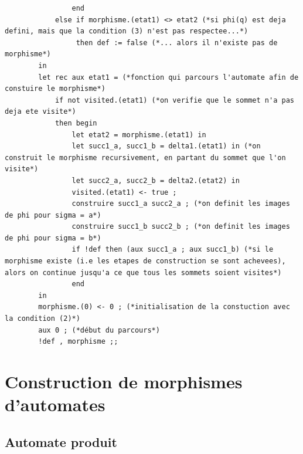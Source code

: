 \documentclass{article}
\begin{document}
\begin{enumerate}
\begin{verbatim}
                end
            else if morphisme.(etat1) <> etat2 (*si phi(q) est deja defini, mais que la condition (3) n'est pas respectee...*)
                 then def := false (*... alors il n'existe pas de morphisme*)
        in
        let rec aux etat1 = (*fonction qui parcours l'automate afin de constuire le morphisme*)
            if not visited.(etat1) (*on verifie que le sommet n'a pas deja ete visite*)
            then begin
                let etat2 = morphisme.(etat1) in
                let succ1_a, succ1_b = delta1.(etat1) in (*on construit le morphisme recursivement, en partant du sommet que l'on visite*)
                let succ2_a, succ2_b = delta2.(etat2) in
                visited.(etat1) <- true ;
                construire succ1_a succ2_a ; (*on definit les images de phi pour sigma = a*)
                construire succ1_b succ2_b ; (*on definit les images de phi pour sigma = b*)
                if !def then (aux succ1_a ; aux succ1_b) (*si le morphisme existe (i.e les etapes de construction se sont achevees), alors on continue jusqu'a ce que tous les sommets soient visites*)
                end 
        in
        morphisme.(0) <- 0 ; (*initialisation de la constuction avec la condition (2)*)
        aux 0 ; (*début du parcours*)
        !def , morphisme ;; 
    \end{verbatim}
\end{enumerate}

\section{Construction de morphismes d'automates}

\subsection{Automate produit}
\end{document}

